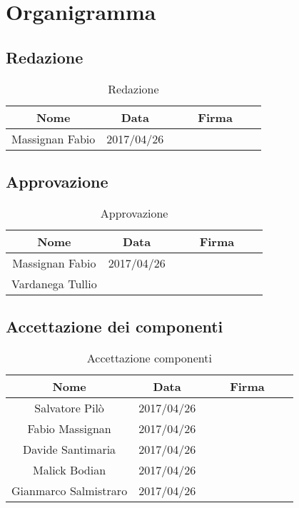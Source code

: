 \section{Organigramma}
	\subsection{Redazione}
	\begin{table}[H]
		\centering
		\begin{tabular}{|c|c|ccccc|}
			\hline
			\textbf{Nome}		& \textbf{Data}	&	&	& \textbf{Firma}	&	& \\
			\hline
			Massignan Fabio		& 		2017/04/26		&     &     &     &     & \\
			\hline
		\end{tabular}
		\caption{Redazione}
	\end{table}
	\subsection{Approvazione}
	\begin{table}[H]
		\centering
		\begin{tabular}{|c|c|ccccc|}
			\hline
			\textbf{Nome}		& \textbf{Data}	&	&	& \textbf{Firma}	&	& \\
			\hline
			Massignan Fabio		& 		2017/04/26		&     &     &     &     & \\
			Vardanega Tullio	& 				&     &     &     &     & \\
			\hline
		\end{tabular}
		\caption{Approvazione}
	\end{table}
	\subsection{Accettazione dei componenti}
	\begin{table}[H]
		\centering
		\begin{tabular}{|c|c|ccccc|}
			\hline
			\textbf{Nome}		& \textbf{Data}	&	&	& \textbf{Firma}	&	& \\
			\hline
			Salvatore Pilò			& 	2017/04/26	&     &     &     &     & \\
			Fabio Massignan			&	2017/04/26	&     &     &     &     & \\
			Davide Santimaria		&	2017/04/26	&     &     &     &     & \\
			Malick Bodian			& 	2017/04/26	&     &     &     &     & \\
			Gianmarco Salmistraro	&	2017/04/26	&     &     &     &     & \\
			\hline
		\end{tabular}
		\caption{Accettazione componenti}
	\end{table}
